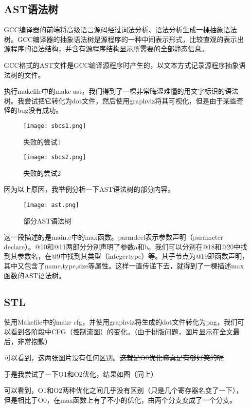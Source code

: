 \documentclass[lang=cn,11pt,a4paper,cite=authoryear]{elegantpaper}
\begin{document}
\subsection{AST语法树}

GCC编译器的前端将高级语言源码经过词法分析、语法分析生成一棵抽象语法树。GCC编译器的抽象语法树是源程序的一种中间表示形式，比较直观的表示出源程序的语法结构，并含有源程序结构显示所需要的全部静态信息。

GCC格式的AST文件是GCC编译源程序时产生的，以文本方式记录源程序抽象语法树的文件。

执行makefile中的make ast，我们得到了一棵\sout{非常晦涩难懂的}用文字标识的语法树。我尝试把它转化为dot文件，然后使用graphviz将其可视化，但是由于某些奇怪的bug没有成功。

\begin{figure}[htbp]
  \centering
  \texttt{[image: sbcs1.png]}
  \caption{失败的尝试1}
\end{figure}

\begin{figure}[htbp]
  \centering
  \texttt{[image: sbcs2.png]}
  \caption{失败的尝试2}
\end{figure}

因为以上原因，我举例分析一下AST语法树的部分内容。

\begin{figure}[htbp]
  \centering
  \texttt{[image: ast.png]}
  \caption{部分AST语法树}
\end{figure}

这一段描述的是main.c中的max函数。parmdecl表示参数声明（parameter declare）。@10和@11两部分分别声明了参数a和b。我们可以分别在@18和@20中找到其参数名，在@9中找到其类型（integertype）等。其子节点为@19即函数声明，其中又包含了name,type,size等属性。这样一直传递下去，就得到了一棵描述max函数的AST语法树。

\subsection{STL}

使用Makefile中的make cfg，并使用graphviz将生成的dot文件转化为png，我们可以看到各阶段中CFG（控制流图）的变化。（由于排版问题，图片显示在全文最后，非常抱歉）

可以看到，这两张图片没有任何区别。\sout{这就是O0优化嘛真是有够好笑的呢}

于是我尝试了一下O1和O2优化，结果如图（同上）

可以看到，O1和O2两种优化之间几乎没有区别（只是几个寄存器名变了一下），但是相比于O0，在max函数上有了不小的优化，由两个分支变成了一个分支。
\end{document}
